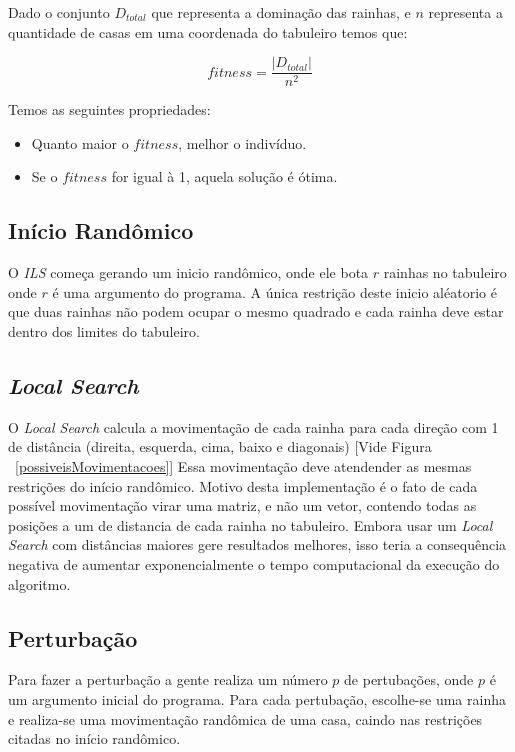 \documentclass[
	article,			%
	11pt,				%
	oneside,			%
	a4paper,			%
	english,			%
	brazil,				%
	sumario=tradicional
	]{abntex2}
\begin{document}
Dado o conjunto $D{_{total}}$ que representa a dominação das rainhas, e $n$ representa a quantidade de casas em uma coordenada do tabuleiro temos que:

\begin{equation}
 fitness = \frac{\left | D{_{total}} \right |}{n^{2}}
\end{equation}

Temos as seguintes propriedades:
\begin{itemize}

  \item Quanto maior o $fitness$, melhor o indivíduo.
  
  \item Se o $fitness$ for igual à 1, aquela solução é ótima.
  
\end{itemize}

\subsection{Início Randômico}

O \textit{ILS} começa gerando um inicio randômico, onde ele bota $r$ rainhas no tabuleiro onde $r$ é uma argumento do programa. A única restrição deste inicio aléatorio é que duas rainhas não podem ocupar o mesmo quadrado e cada rainha deve estar dentro dos limites do tabuleiro.

\subsection{\textit{Local Search}}
O \textit{Local Search} calcula a movimentação de cada rainha para cada direção com 1 de distância (direita, esquerda, cima, baixo e diagonais) [Vide Figura ~\ref{possiveisMovimentacoes}] Essa movimentação deve atendender as mesmas restrições do início randômico. Motivo desta implementação é o fato de cada possível movimentação virar uma matriz, e não um vetor, contendo todas as posições a um de distancia de cada rainha no tabuleiro. Embora usar um \textit{Local Search} com distâncias maiores gere resultados melhores, isso teria a consequência negativa de aumentar exponencialmente o tempo computacional da execução do algoritmo.

\subsection{Perturbação}
Para fazer a perturbação a gente realiza um número $p$ de pertubações, onde $p$ é um argumento inicial do programa. 
Para cada pertubação, escolhe-se uma rainha e realiza-se uma movimentação randômica de uma casa, caindo nas restrições citadas no início randômico.
\end{document}
